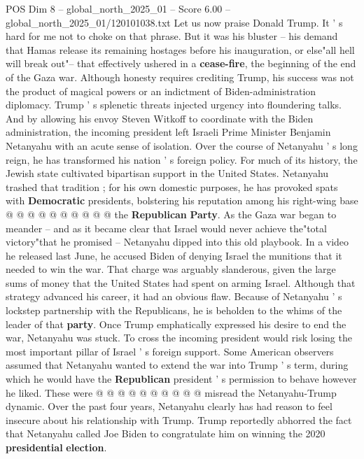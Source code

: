 \begin{textsample}{POS Dim 8 – global\_north\_2025\_01 – Score 6.00 – global\_north\_2025\_01/120101038.txt}  \label{ex:f8_pos_297}
Let us now praise Donald Trump.
It ' s hard for me not to choke on that phrase.
But it was his bluster -- his demand that Hamas release its remaining hostages before his inauguration, or else"all hell will break out"-- that effectively ushered in a \textbf{cease-fire}, the beginning of the end of the Gaza war.
Although honesty requires crediting Trump, his success was not the product of magical powers or an indictment of Biden-administration diplomacy.
Trump ' s splenetic threats injected urgency into floundering talks.
And by allowing his envoy Steven Witkoff to coordinate with the Biden administration, the incoming president left Israeli Prime Minister Benjamin Netanyahu with an acute sense of isolation.
Over the course of Netanyahu ' s long reign, he has transformed his nation ' s foreign policy.
For much of its history, the Jewish state cultivated bipartisan support in the United States.
Netanyahu trashed that tradition ; for his own domestic purposes, he has provoked spats with \textbf{Democratic} presidents, bolstering his reputation among his right-wing base @ @ @ @ @ @ @ @ @ @ the \textbf{Republican} \textbf{Party}.
As the Gaza war began to meander -- and as it became clear that Israel would never achieve the"total victory"that he promised -- Netanyahu dipped into this old playbook.
In a video he released last June, he accused Biden of denying Israel the munitions that it needed to win the war.
That charge was arguably slanderous, given the large sums of money that the United States had spent on arming Israel.
Although that strategy advanced his career, it had an obvious flaw.
Because of Netanyahu ' s lockstep partnership with the Republicans, he is beholden to the whims of the leader of that \textbf{party}.
Once Trump emphatically expressed his desire to end the war, Netanyahu was stuck.
To cross the incoming president would risk losing the most important pillar of Israel ' s foreign support.
Some American observers assumed that Netanyahu wanted to extend the war into Trump ' s term, during which he would have the \textbf{Republican} president ' s permission to behave however he liked.
These were @ @ @ @ @ @ @ @ @ @ misread the Netanyahu-Trump dynamic.
Over the past four years, Netanyahu clearly has had reason to feel insecure about his relationship with Trump.
Trump reportedly abhorred the fact that Netanyahu called Joe Biden to congratulate him on winning the 2020 \textbf{presidential} \textbf{election}.

\end{textsample}
